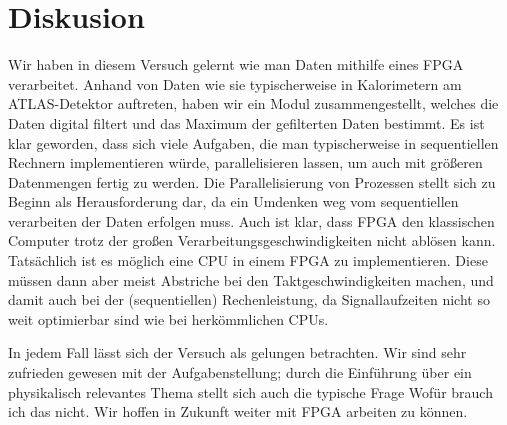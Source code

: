 \section{Diskusion}
Wir haben in diesem Versuch gelernt wie man Daten mithilfe eines FPGA verarbeitet.
Anhand von Daten wie sie typischerweise in Kalorimetern am ATLAS-Detektor auftreten, haben wir ein Modul zusammengestellt, welches die Daten digital filtert und das Maximum der gefilterten Daten bestimmt.
Es ist klar geworden, dass sich viele Aufgaben, die man typischerweise in sequentiellen Rechnern implementieren würde, parallelisieren lassen, um auch mit größeren Datenmengen fertig zu werden.
Die Parallelisierung von Prozessen stellt sich zu Beginn als Herausforderung dar, da ein Umdenken weg vom sequentiellen verarbeiten der Daten erfolgen muss.
Auch ist klar, dass FPGA den klassischen Computer trotz der großen Verarbeitungsgeschwindigkeiten nicht ablösen kann.
Tatsächlich ist es möglich eine CPU in einem FPGA zu implementieren.
Diese müssen dann aber meist Abstriche bei den Taktgeschwindigkeiten machen, und damit auch bei der (sequentiellen) Rechenleistung, da Signallaufzeiten nicht so weit optimierbar sind wie bei herkömmlichen CPUs.

In jedem Fall lässt sich der Versuch als gelungen betrachten.
Wir sind sehr zufrieden gewesen mit der Aufgabenstellung; durch die Einführung über ein physikalisch relevantes Thema stellt sich auch die typische Frage \glqq Wofür brauch ich das\grqq{} nicht.
Wir hoffen in Zukunft weiter mit FPGA arbeiten zu können.
